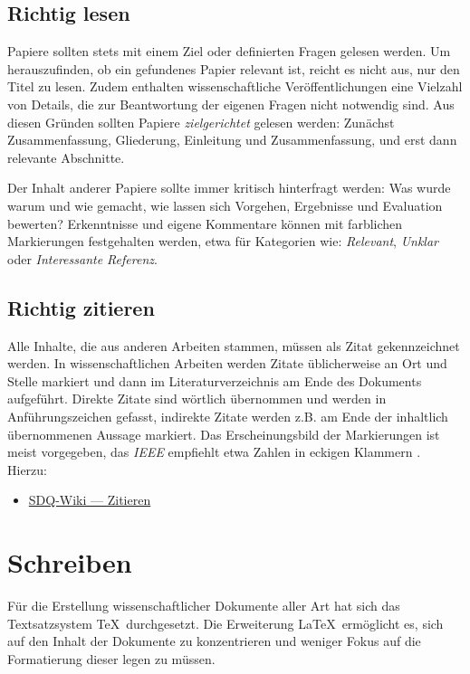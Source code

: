 \subsection{Richtig lesen}%
\label{sec:Recherchieren:Lesen}

Papiere sollten stets mit einem Ziel oder definierten Fragen gelesen werden.
Um herauszufinden, ob ein gefundenes Papier relevant ist, reicht es nicht aus, nur den Titel zu lesen.
Zudem enthalten wissenschaftliche Veröffentlichungen eine Vielzahl von Details, die zur Beantwortung der eigenen Fragen nicht notwendig sind.
Aus diesen Gründen sollten Papiere \emph{zielgerichtet} gelesen werden: Zunächst Zusammenfassung, Gliederung, Einleitung und Zusammenfassung, und erst dann relevante Abschnitte.

Der Inhalt anderer Papiere sollte immer kritisch hinterfragt werden: Was wurde warum und wie gemacht, wie lassen sich Vorgehen, Ergebnisse und Evaluation bewerten?
Erkenntnisse und eigene Kommentare können mit farblichen Markierungen festgehalten werden, etwa für Kategorien wie: \emph{Relevant}, \emph{Unklar} oder \emph{Interessante Referenz}.

\subsection{Richtig zitieren}%
\label{sec:Recherchieren:Zitieren}

Alle Inhalte, die aus anderen Arbeiten stammen, müssen als Zitat gekennzeichnet werden.
In wissenschaftlichen Arbeiten werden Zitate üblicherweise an Ort und Stelle markiert und dann im Literaturverzeichnis am Ende des Dokuments aufgeführt.
Direkte Zitate sind wörtlich übernommen und werden in Anführungszeichen gefasst, indirekte Zitate werden z.B. am Ende der inhaltlich übernommenen Aussage markiert.
Das Erscheinungsbild der Markierungen ist meist vorgegeben, das \emph{IEEE} empfiehlt etwa Zahlen in eckigen Klammern \cite{IEEE2021}.
Hierzu:

\smallskip
\begin{itemize}[label={\symbolInfo}]
    \item \href{https://sdqweb.ipd.kit.edu/wiki/Zitieren}{SDQ-Wiki --- Zitieren}
\end{itemize}


\section{Schreiben}%
\label{sec:Schreiben}

Für die Erstellung wissenschaftlicher Dokumente aller Art hat sich das Textsatzsystem \TeX\ durchgesetzt.
Die Erweiterung \LaTeX\ ermöglicht es, sich auf den Inhalt der Dokumente zu konzentrieren und weniger Fokus auf die Formatierung dieser legen zu müssen.

